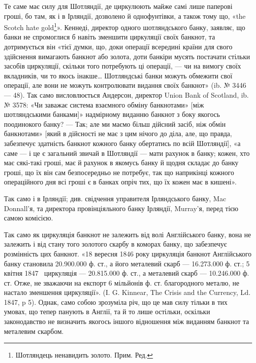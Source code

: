 Те саме має силу для Шотляндії, де циркулюють майже самі лише паперові
гроші, бо там, як і в Ірляндії, дозволено й однофунтівки, а також
тому що, «the Scotch hate gold\footnote*{
Шотляндець ненавидить золото. Прим. Ред.
}». Кеннеді, директор одного шотляндського банку,
заявляє, що банки не спромоглися б навіть зменшити циркуляції своїх банкнот,
та дотримується він «тієї думки, що, доки операції всередині країни для свого
здійснення вимагають банкнот або золота, доти банкіри мусять постачати стільки
засобів циркуляції, скільки того потребують ці операції, — чи на вимогу своїх
вкладників, чи то якось інакше\dots{} Шотляндські банки можуть обмежити свої
операції, але вони не можуть контролювати видання своїх банкнот» (ib. № 3446 —
48). Так само висловлюється Андерсон, директор Union Bank of Scotland, ib.
№ 3578: «Чи заважає система взаємного обміну банкнотами» [між шотляндськими
банками]» надмірному виданню банкнот з боку якогось поодинокого банку? —
Так; але ми маємо більш дійсний засіб, ніж обмін банкнотами» [який в дійсності
не має з цим нічого до діла, але, що правда, забезпечує здатність банкнот кожного
банку обертатись по всій Шотляндії], «а саме — і це є загальний звичай
в Шотляндії — мати рахунок в банку; кожен, хто має сякі-такі гроші, має
й рахунок в якомусь банку й щодня складає до банку гроші, що їх він сам
безпосередньо не потребує, так що наприкінці кожного операційного дня всі
гроші є в банках опріч тих, що їх кожен має в кишені».

Так само і в Ірляндії; див. свідчення управителя Ірляндського банку,
Mac Donnall’я, та директора провінціяльного банку Ірляндії, Murray’я, перед
тією самою комісією.

Так само як циркуляція банкнот не залежить від волі Англійського банку,
вона не залежить і від стану того золотого скарбу в коморах банку, що забезпечує
розмінність цих банкнот. «18 вересня 1846 року циркуляція банкнот
Англійського банку становила 20.900.000 ф. ст., а його металевий скарб —
16.273.000 ф. ст.; 5 квітня 1847~ циркуляція — 20.815.000 ф. ст., а металевий
скарб — 10.246.000 ф. ст. Отже, не зважаючи на експорт 6 мільйонів ф. ст. благородного
металю, не настало зменшення циркуляції». (I. G. Kinnear, The Crisis
and the Currency, Ld. 1847, p 5). Однак, само собою зрозуміла річ, що це мав силу
тільки в тих умовах, що тепер панують в Англії, та й то лише остільки, оскільки
законодавство не визначить якогось іншого відношення між виданням банкнот
та металевим скарбом.

